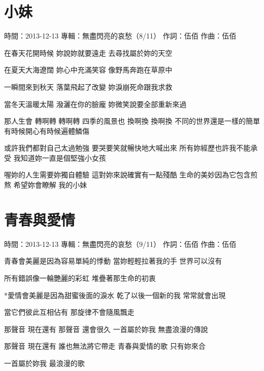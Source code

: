 \documentclass[UTF8,a4paper,oneside,twocolumn,12pt]{ctexbook}
\newcommand{\infopair}[2]{\textbullet #1：#2}
\newcommand{\zc}[1][伍佰]{\infopair{作詞}{#1}}
\newcommand{\zq}[1][伍佰]{\infopair{作曲}{#1}}
\newcommand{\zj}[1]{\infopair{專輯}{#1}}
\newcommand{\sj}[1]{\infopair{時間}{#1}}
\newenvironment{info}{\begin{flushleft}\kaishu
	}
	{\end{flushleft}\normalsize\yahei\par}
\newenvironment{lyric}{
	}
{}
\begin{document}
\section{小妹}
\begin{info}
	\sj{2013-12-13}
	\zj{無盡閃亮的哀愁（8/11）}
	\zc
	\zq
\end{info}
\begin{lyric}
	在春天花開時候
	妳說妳就要遠走
	去尋找屬於妳的天空

	在夏天大海遼闊
	妳心中充滿笑容
	像野馬奔跑在草原中

	一瞬間來到秋天
	落葉飛起了改變
	妳淚崩死命跟我求救

	當冬天溫暖太陽
	潑灑在你的臉龐
	妳微笑說要全部重新來過

	那人生會 轉啊轉 轉啊轉
	四季的風景也 換啊換 換啊換
	不同的世界還是一樣的簡單
	有時候開心有時候遍體鱗傷

	或許我們都對自己太過勉強
	要哭要笑就暢快地大喊出來
	所有妳經歷也許我不能承受
	我知道妳一直是個堅強小女孩

	喔妳的人生需要妳獨自體驗
	這對妳來說確實有一點殘酷
	生命的美妙因為它包含煎熬
	希望妳會瞭解 我的小妹
\end{lyric}

\section{青春與愛情}
\begin{info}
	\sj{2013-12-13}
	\zj{無盡閃亮的哀愁（9/11）}
	\zc
	\zq
\end{info}
\begin{lyric}
	青春會美麗是因為容易單純的悸動
	當妳輕輕拉著我的手  世界可以沒有

	所有錯誤像一輪艷麗的彩虹
	堆疊著那生命的初衷

	*愛情會美麗是因為甜蜜後面的淚水
	乾了以後一個新的我  常常就會出現

	當它們彼此互相佔有
	那旋律不會隨風飄走

	那聲音  現在還有  那聲音  還會很久
	一首屬於妳我  無盡浪漫的傳說

	那聲音  現在還有  誰也無法將它帶走
	青春與愛情的歌  只有妳來合

	一首屬於妳我  最浪漫的歌
\end{lyric}
\end{document}
